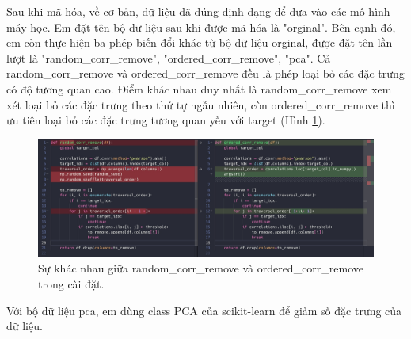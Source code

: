 Sau khi mã hóa, về cơ bản, dữ liệu đã đúng định dạng để đưa vào các mô hình máy học. Em đặt tên bộ dữ liệu sau khi được mã hóa là "orginal". Bên cạnh đó, em còn thực hiện ba phép biến đổi khác từ bộ dữ liệu orginal, được đặt tên lần lượt là "random\_corr\_remove", "ordered\_corr\_remove", "pca". Cả random\_corr\_remove và ordered\_corr\_remove đều là phép loại bỏ các đặc trưng có độ tương quan cao. Điểm khác nhau duy nhất là random\_corr\_remove xem xét loại bỏ các đặc trưng theo thứ tự ngẫu nhiên, còn ordered\_corr\_remove thì ưu tiên loại bỏ các đặc trưng tương quan yếu với target (Hình \ref{fig:corr}).
\begin{figure}
    \centering
    \includegraphics[width=\linewidth]{img/corr.jpeg}
    \caption {Sự khác nhau giữa random\_corr\_remove và ordered\_corr\_remove trong cài đặt.}
    \label{fig:corr}
\end{figure}
Với bộ dữ liệu pca, em dùng class PCA của scikit-learn để giảm số đặc trưng của dữ liệu.

